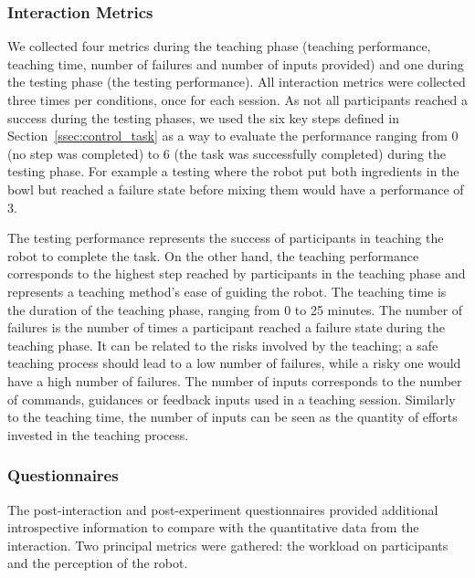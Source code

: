 \subsubsection{Interaction Metrics}

We collected four metrics during the teaching phase (teaching performance, teaching time, number of failures and number of inputs provided) and one during the testing phase (the testing performance). All interaction metrics were collected three times per conditions, once for each session. As not all participants reached a success during the testing phases, we used the six key steps defined in Section~\ref{ssec:control_task} as a way to evaluate the performance ranging from 0 (no step was completed) to 6 (the task was successfully completed) during the testing phase. For example a testing where the robot put both ingredients in the bowl but reached a failure state before mixing them would have a performance of 3. 

The testing performance represents the success of participants in teaching the robot to complete the task. On the other hand, the teaching performance corresponds to the highest step reached by participants in the teaching phase and represents a teaching method's ease of guiding the robot. The teaching time is the duration of the teaching phase, ranging from 0 to 25 minutes. The number of failures is the number of times a participant reached a failure state during the teaching phase. It can be related to the risks involved by the teaching; a safe teaching process should lead to a low number of failures, while a risky one would have a high number of failures. The number of inputs corresponds to the number of commands, guidances or feedback inputs used in a teaching session. Similarly to the teaching time, the number of inputs can be seen as the quantity of efforts invested in the teaching process.

\subsubsection{Questionnaires} \label{ssec:control_questionnaires}

The post-interaction and post-experiment questionnaires provided additional introspective information to compare with the quantitative data from the interaction. Two principal metrics were gathered: the workload on participants and the perception of the robot. 

